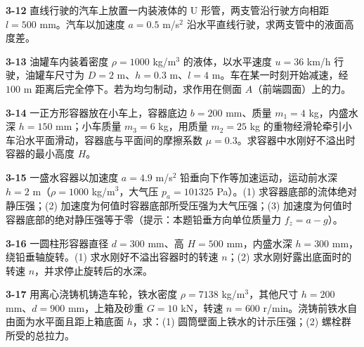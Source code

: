 \begin{ti}
\item[\textbf{3-12}] 直线行驶的汽车上放置一内装液体的 U 形管，两支管沿行驶方向相距 $l=500$ mm。汽车以加速度 $a=0.5$ m/s$^2$ 沿水平直线行驶，求两支管中的液面高度差。
\quad{}\quad{}

\item[\textbf{3-13}] 油罐车内装着密度 $\rho=1000$ kg/m$^3$ 的液体，以水平速度 $u=36$ km/h 行驶，油罐车尺寸为 $D=2$ m、$h=0.3$ m、$l=4$ m。车在某一时刻开始减速，经 $100$ m 距离后完全停下。若为均匀制动，求作用在侧面 $A$（前端圆面）上的力。
\quad{}\quad{}

\item[\textbf{3-14}] 一正方形容器放在小车上，容器底边 $b=200$ mm、质量 $m_1=4$ kg，内盛水深 $h=150$ mm；小车质量 $m_3=6$ kg，用质量 $m_2=25$ kg 的重物经滑轮牵引小车沿水平面滑动，容器底与平面间的摩擦系数 $\mu=0.3$。求容器中水刚好不溢出时容器的最小高度 $H$。
\quad{}\quad{}

\item[\textbf{3-15}] 一盛水容器以加速度 $a=4.9$ m/s$^2$ 铅垂向下作等加速运动，运动前水深 $h=2$ m（$\rho=1000$ kg/m$^3$，大气压 $p_a=101325$ Pa）。(1) 求容器底部的流体绝对静压强；(2) 加速度为何值时容器底部所受压强为大气压强；(3) 加速度为何值时容器底部的绝对静压强等于零（提示：本题铅垂方向单位质量力 $f_z=a-g$）。
\quad{}\quad{}

\item[\textbf{3-16}] 一圆柱形容器直径 $d=300$ mm、高 $H=500$ mm，内盛水深 $h=300$ mm，绕铅垂轴旋转。(1) 求水刚好不溢出容器时的转速 $n$；(2) 求水刚好露出底面时的转速 $n$，并求停止旋转后的水深。
\quad{}\quad{}

\item[\textbf{3-17}] 用离心浇铸机铸造车轮，铁水密度 $\rho=7138$ kg/m$^3$，其他尺寸 $h=200$ mm、$d=900$ mm，上箱及砂重 $G=10$ kN，转速 $n=600$ r/min。浇铸前铁水自由面为水平面且距上箱底面 $h$，求：(1) 圆筒壁面上铁水的计示压强；(2) 螺栓群所受的总拉力。
\quad{}\quad{}


\end{ti}
